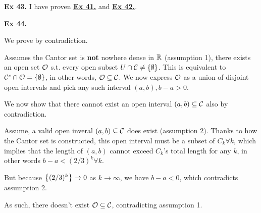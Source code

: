 \noindent {}\textbf{Ex 43.} \label{ex:2_43}
I have proven \hyperref[ex:2_41]{\underline{\textbf{Ex 41.}}} and \hyperref[ex:2_42]{\underline{\textbf{Ex 42.}}}.


\noindent {}\textbf{Ex 44.} \label{ex:2_44}

We prove by contradiction.

Assumes the Cantor set is \textbf{not} nowhere dense in $\mathbb{R}$ (assumption 1), 
there exists an open set $\mathcal{O}$ s.t. every open subset $U \cap \mathcal{C} \neq \left\{\emptyset\right\}$.
This is equivalent to $\mathcal{C}^c \cap \mathcal{O} = \left\{\emptyset\right\}$, in other words, $\mathcal{O} \subseteq \mathcal{C}$.
We now express $\mathcal{O}$ as a union of disjoint open intervals and pick any such interval $(a,b), b-a > 0$.

We now show that there cannot exist an open interval $(a,b) \subseteq \mathcal{C}$ also by contradiction.

Assume, a valid open inveral $(a,b) \subseteq \mathcal{C}$ does exist (assumption 2).
Thanks to how the Cantor set is constructed, this open interval must be a subset of $ C_k \forall k$, 
which implies that the length of $(a,b)$ cannot exceed $C_k$'s total length for any $k$, in other words $b-a < (2/3)^k \forall k$.

But because $\left\{(2/3)^k\right\} \to 0$ as $k\to\infty$, we have $b-a < 0$, which contradicts assumption 2.

As such, there doesn't exist $\mathcal{O} \subseteq \mathcal{C}$, contradicting assumption 1.
